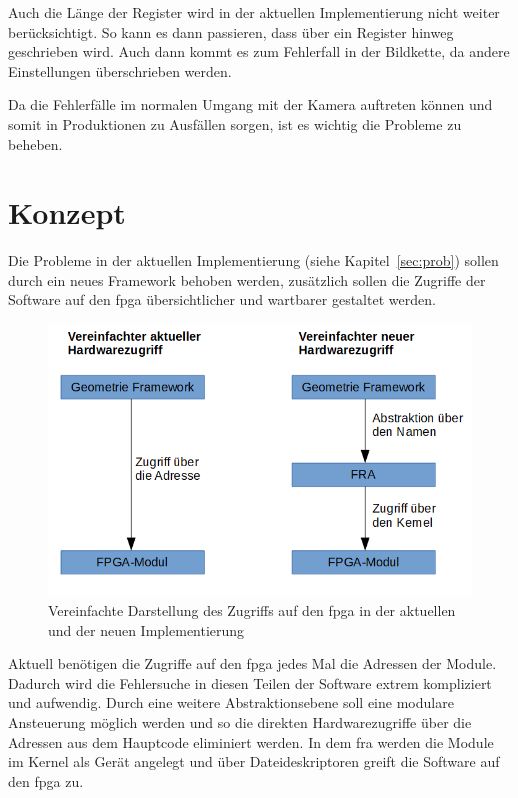 Auch die Länge der Register wird in der aktuellen Implementierung nicht weiter berücksichtigt. So kann es dann passieren, dass über ein Register hinweg geschrieben wird. Auch dann kommt es zum Fehlerfall in der Bildkette, da andere Einstellungen überschrieben werden. 

Da die Fehlerfälle im normalen Umgang mit der Kamera auftreten können und somit in Produktionen zu Ausfällen sorgen, ist es wichtig die Probleme zu beheben.

\section{Konzept}\label{sec:konzept}
Die Probleme in der aktuellen Implementierung (siehe Kapitel~\ref{sec:prob}) sollen durch ein neues Framework behoben werden, zusätzlich sollen die Zugriffe der Software auf den \ac{fpga} übersichtlicher und wartbarer gestaltet werden.

\begin{figure}[!hbtp]
	\centering
	\includegraphics[width = 0.9\linewidth]{pictures/2019-11-17_ImplementierungNewvsOld.png}
	\smallskip
	\caption{Vereinfachte Darstellung des Zugriffs auf den \ac{fpga} in der aktuellen und der neuen Implementierung}
	\label{fig:newvsold}
\end{figure} 



Aktuell benötigen die Zugriffe auf den \ac{fpga} jedes Mal die Adressen der Module. Dadurch wird die Fehlersuche in diesen Teilen der Software extrem kompliziert und aufwendig. Durch eine weitere Abstraktionsebene soll eine modulare Ansteuerung möglich werden und so die direkten Hardwarezugriffe über die Adressen aus dem Hauptcode eliminiert werden. In dem \ac{fra} werden die Module im Kernel als Gerät angelegt und über Dateideskriptoren greift die Software auf den \ac{fpga} zu.


